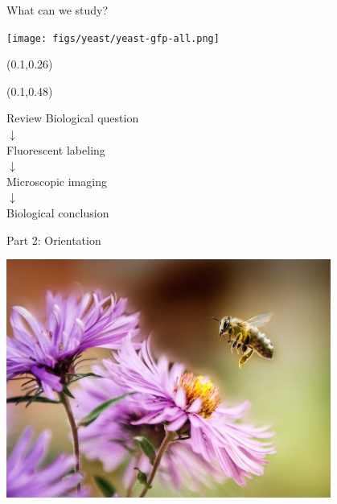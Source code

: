 \documentclass[presentation]{beamer}
\begin{document}
\begin{frame}[label=sec-1]{What can we study?}
  \begin{center}
    \texttt{[image: figs/yeast/yeast-gfp-all.png]}
\end{center}
\setlength{\TPHorizModule}{\textwidth}
\setlength{\TPVertModule}{\textwidth}
\begin{textblock}{0.5}(0.1,0.26)
 \end{textblock}
\begin{textblock}{0.49}(0.1,0.48)
 \end{textblock}

\end{frame}

\begin{frame}{Review}
  \centering
  \Large
  Biological question\\ $\downarrow$ \\
  Fluorescent labeling\\ $\downarrow$ \\
  Microscopic imaging \\ $\downarrow$ \\
  Biological conclusion
\end{frame}

\begin{frame}[label=sec-1]{Part 2: Orientation}
 \begin{center}
   \includegraphics[width=0.8\textwidth]{figs/bee2.jpg}
 \end{center}
\end{frame}
\end{document}
